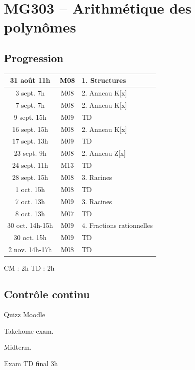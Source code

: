 \documentclass[12pt]{beamer}
\begin{document}
\section{MG303 -- Arithmétique des polynômes}
\subsection{Progression}

\begin{frame}
\centering
\begin{tabular}{|c|c|p{}|}\hline 
	31 août 11h & M08 & 1. Structures \\ \hline
	3 sept. 7h & M08 & 2. Anneau K[x] \\ \hline
	7 sept. 7h & M08 & 2. Anneau K[x] \\ \hline \rowcolor{gray!50}
	9 sept. 15h & M09 & TD \\ \hline
	16 sept. 15h & M08 & 2. Anneau K[x] \\ \hline \rowcolor{gray!50}
	17 sept. 13h & M09 & TD \\ \hline
	23 sept. 9h & M08 & 2. Anneau Z[x]  \\ \hline \rowcolor{gray!50}
	24 sept. 11h & M13 & TD \\ \hline
	28 sept. 15h & M08 & 3. Racines \\ \hline \rowcolor{gray!50}
	1 oct. 15h & M08 & TD \\ \hline
	7 oct. 13h & M09 & 3. Racines \\ \hline\rowcolor{gray!50}
	8 oct. 13h & M07 & TD \\ \hline
	30 oct. 14h-15h & M09 & 4. Fractions rationnelles \\ \hline\rowcolor{gray!50}
	30 oct. 15h & M09 & TD \\ \hline\rowcolor{gray!50}
	2 nov. 14h-17h & M08 & TD \\ \hline
\end{tabular}

\vspace{5pt}
\hfill CM : 2h \hfill TD : 2h \hfill \,

\end{frame}

\subsection{Contrôle continu}

\begin{frame}
Quizz Moodle

Takehome exam.

Midterm.

Exam TD final 3h
\end{frame}
\end{document}
